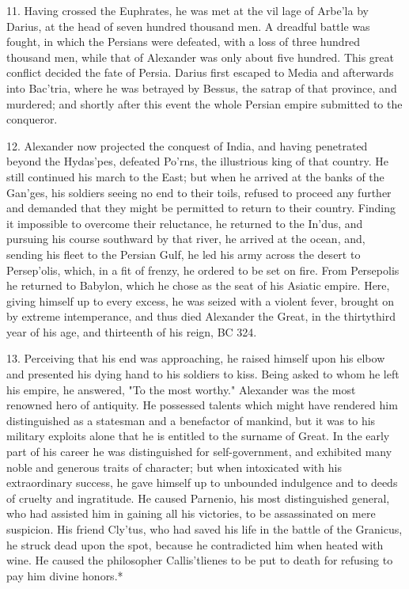 \documentclass[openany,a4paper]{memoir}
\begin{document}
11. Having crossed the Euphrates, he was met at the vil
lage of Arbe'la by Darius, at the head of seven hundred 
thousand men. A dreadful battle was fought, in which the 
Persians were defeated, with a loss of three hundred thousand 
men, while that of Alexander was only about five hundred. 
This great conflict decided the fate of Persia. Darius first 
escaped to Media and afterwards into Bac'tria, where he was 
betrayed by Bessus, the satrap of that province, and murdered; 
and shortly after this event the whole Persian empire submitted to the conqueror. 

12. Alexander now projected the conquest of India, and 
having penetrated beyond the Hydas'pes, defeated Po'rns, 
the illustrious king of that country. He still continued his 
march to the East; but when he arrived at the banks of the 
Gan'ges, his soldiers seeing no end to their toils, refused to 
proceed any further and demanded that they might be permitted to return to their country. Finding it impossible to 
overcome their reluctance, he returned to the In'dus, and 
pursuing his course southward by that river, he arrived at 
the ocean, and, sending his fleet to the Persian Gulf, he led 
his army across the desert to Persep'olis, which, in a fit of 
frenzy, he ordered to be set on fire. From Persepolis he returned to Babylon, which he chose as the seat of his Asiatic 
empire. Here, giving himself up to every excess, he was 
seized with a violent fever, brought on by extreme intemperance, and thus died Alexander the Great, in the thirtythird year of his age, and thirteenth of his reign, BC 324. 

13. Perceiving that his end was approaching, he raised 
himself upon his elbow and presented his dying hand to his 
soldiers to kiss. Being asked to whom he left his empire, he 
answered, "To the most worthy." Alexander was the most 
renowned hero of antiquity. He possessed talents which 
might have rendered him distinguished as a statesman and a 
benefactor of mankind, but it was to his military exploits 
alone that he is entitled to the surname of Great. In the early 
part of his career he was distinguished for self-government, 
and exhibited many noble and generous traits of character; 
but when intoxicated with his extraordinary success, he gave 
himself up to unbounded indulgence and to deeds of cruelty 
and ingratitude. He caused Parnenio, his most distinguished 
general, who had assisted him in gaining all his victories, to 
be assassinated on mere suspicion. His friend Cly'tus, who 
had saved his life in the battle of the Granicus, he struck 
dead upon the spot, because he contradicted him when heated 
with wine. He caused the philosopher Callis'tlienes to be 
put to death for refusing to pay him divine honors.* 
\end{document}
